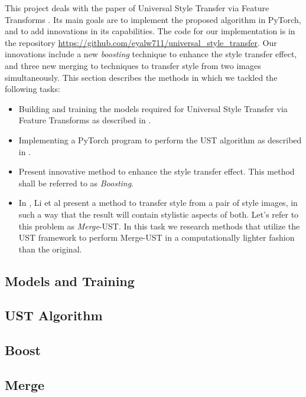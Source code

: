 \hspace{0.5cm} This project deals with the paper of Universal Style Transfer via Feature Transforms \cite{bib11}. Its main goals are to implement the proposed algorithm in PyTorch, and to add innovations in its capabilities. The code for our implementation is in the repository \url{https://github.com/eyalw711/universal_style_transfer}. Our innovations include a new \textit{boosting} technique to enhance the style transfer effect, and three new merging to techniques to transfer style from two images simultaneously. This section describes the methods in which we tackled the following tasks: 
\begin{itemize}
	\item Building and training the models required for Universal Style Transfer via Feature Transforms as described in \cite{bib11}.
	\item Implementing a PyTorch program to perform the UST algorithm as described in \cite{bib11}.
	\item Present innovative method to enhance the style transfer effect. This method shall be referred to as \textit{Boosting}.
	\item In \cite{bib11}, Li et al present a method to transfer style from a pair of style images, in such a way that the result will contain stylistic aspects of both. Let's refer to this problem as \textit{Merge}-UST. In this task we research methods that utilize the UST framework to perform Merge-UST in a computationally lighter fashion than the original.
\end{itemize}


\subsection{Models and Training}\label{subsec:Models}
\label{models_methods_lbl}


\subsection{UST Algorithm}
\label{algo_methods_lbl}


\subsection{Boost}
\label{boost_methods_lbl}


\subsection{Merge}
\label{merge_methods_lbl}
